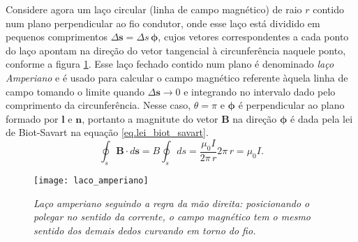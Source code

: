 Considere agora um laço circular (linha de campo magnético) de raio $r$ contido num plano perpendicular ao fio condutor, onde esse laço está dividido em pequenos comprimentos $\Delta\textbf{s}=\Delta s\,\pmb{\phi}$, cujos vetores correspondentes a cada ponto do laço apontam na direção do vetor tangencial à circunferência naquele ponto, conforme  a figura \ref{fig.laco_amperiano}. Esse laço fechado contido num plano é denominado \textit{laço Amperiano} e é usado para calcular o campo magnético referente àquela linha de campo tomando o limite quando $\Delta\textbf{s}\to 0$ e integrando no intervalo dado pelo comprimento da circunferência. Nesse caso, $\theta=\pi$ e $\pmb{\phi}$ é perpendicular ao plano formado por $\textbf{l}$ e $\textbf{n}$, portanto a magnitute do vetor  $\textbf{B}$ na direção $\pmb{\phi}$ é dada pela lei de Biot-Savart na equação \ref{eq.lei_biot_savart}.
\begin{equation*}
\oint_{s}\textbf{B}\cdot d\textbf{s}=B\oint_{s}ds=\frac{\mu_0I}{2\pi\,r}2\pi\,r=\mu_0I.
\end{equation*} 
\begin{figure}[h]
\centering
\texttt{[image: laco\_amperiano]}
\caption{\textit{Laço amperiano seguindo a regra da mão direita: posicionando o polegar no sentido da corrente, o campo magnético tem o mesmo sentido dos demais dedos curvando em torno do fio.}}
\label{fig.laco_amperiano}
\end{figure}

